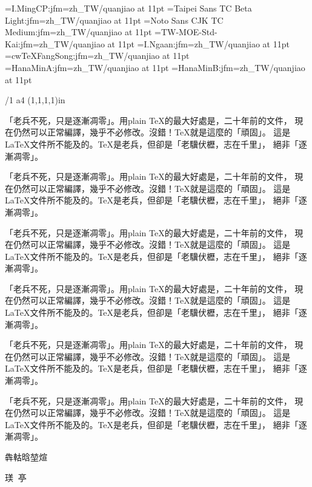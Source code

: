 
\jfont\ming={I.MingCP:jfm=zh_TW/quanjiao} at 11pt
\jfont\hei={Taipei Sans TC Beta Light:jfm=zh_TW/quanjiao} at 11pt
\jfont\heib={Noto Sans CJK TC Medium:jfm=zh_TW/quanjiao} at 11pt
\jfont\kai={TW-MOE-Std-Kai:jfm=zh_TW/quanjiao} at 11pt
\jfont\iyan={I.Ngaan:jfm=zh_TW/quanjiao} at 11pt
\jfont\fangsong={cwTeXFangSong:jfm=zh_TW/quanjiao} at 11pt
\jfont\hminga={HanaMinA:jfm=zh_TW/quanjiao} at 11pt
\jfont\hmingb={HanaMinB:jfm=zh_TW/quanjiao} at 11pt


\margins/1 a4 (1,1,1,1)in  %
\typosize[11/16.4]

\def\mytext{
「老兵不死，只是逐漸凋零」。用plain \TeX{}的最大好處是，二十年前的文件，
現在仍然可以正常編譯，幾乎不必修改。沒錯！\TeX{}就是這麼的「頑固」。
這是\LaTeX{}文件所不能及的。\TeX{}是老兵，但卻是「老驥伏櫪，志在千里」，
絕非「逐漸凋零」。}

\ming
\mytext

\hei
\mytext

\heib
\mytext

\kai
\mytext

\iyan
\mytext

\fangsong
\mytext

\hminga
犇軲晗堃煊

\hmingb
𤧞𠃝𠅀𠅘𫝁𫜁

\bye


